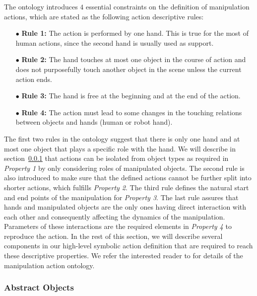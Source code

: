 The ontology introduces $4$ essential constraints on the definition of manipulation actions, which are stated as the following action descriptive rules: 


\begin{itemize}
 \item[$\bullet$] \textbf{Rule 1:} The action is performed by one hand. This is true for the most of human actions, since the second hand is usually used as support.
 \item[$\bullet$] \textbf{Rule 2:} The hand touches at most one object in the course of action and does not purposefully touch another object in the scene unless the current action ends.
 \item[$\bullet$] \textbf{Rule 3:} The hand is free at the beginning and at the end of the action.
 \item[$\bullet$] \textbf{Rule 4:} The action must lead to some changes in the touching relations between objects and hands (\eg human or robot hand).
\end{itemize}



The first two rules in the ontology suggest that there is only one hand and at most one object that plays a specific role with the hand. We will describe in section~\ref{sec:abstractobjects} that actions can be isolated from object types  as required in {\it Property 1} by only considering roles of manipulated objects. The second rule is also introduced to make sure that the defined actions cannot be further split into shorter actions, which fulfills {\it Property 2}. The third  rule defines the natural start and end points of the manipulation for {\it Property 3}. The last rule assures that hands and manipulated objects are the only ones having direct interaction with each other and consequently affecting the dynamics of the manipulation. Parameters of these interactions are the required elements in {\it Property 4} to reproduce the action. In the rest of this section, we will describe several components in our high-level symbolic action definition that are required to reach these descriptive properties.
We refer the interested reader to \cite{TAMD13} for details of the manipulation action ontology. 





\subsubsection{Abstract Objects}
\label{sec:abstractobjects}

